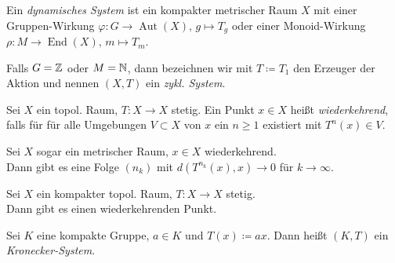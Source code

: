 \documentclass{cheat-sheet}
\DeclareMathOperator{\Aut}{Aut} %
\DeclareMathOperator{\End}{End} %
\begin{document}




\begin{defn}
  Ein \emph{dynamisches System} ist ein kompakter metrischer Raum $X$ mit einer Gruppen-Wirkung $\varphi : G \to \Aut(X), \, g \mapsto T_g$ oder einer Monoid-Wirkung $\rho : M \to \End(X), \, m \mapsto T_m$.
\end{defn}

\begin{bem}
  Falls $G = \mathbb{Z}$ oder $M = \mathbb{N}$, dann bezeichnen wir mit $T \coloneqq T_1$ den Erzeuger der Aktion und nennen $(X, T)$ ein \emph{zykl. System}.
\end{bem}

\begin{defn}
  Sei $X$ ein topol. Raum, $T : X \to X$ stetig.
  Ein Punkt $x \in X$ heißt \emph{wiederkehrend}, falls für für alle Umgebungen $V \subset X$ von $x$ ein $n \geq 1$ existiert mit $T^n(x) \in V$.
\end{defn}

\begin{bem}
  Sei $X$ sogar ein metrischer Raum, $x \in X$ wiederkehrend. \\
  Dann gibt es eine Folge $(n_k)$ mit $d(T^{n_k}(x), x) \to 0$ für $k \to \infty$.
\end{bem}

\begin{thm}
  Sei $X$ ein kompakter topol. Raum, $T : X \to X$ stetig. \\
  Dann gibt es einen wiederkehrenden Punkt.
\end{thm}

\begin{defn}
  Sei $K$ eine kompakte Gruppe, $a \in K$ und $T(x) \coloneqq ax$. Dann heißt $(K, T)$ ein \emph{Kronecker-System}.
\end{defn}
\end{document}
